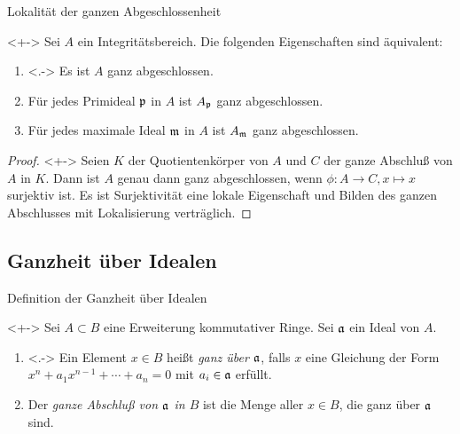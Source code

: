 \begin{frame}{Lokalität der ganzen Abgeschlossenheit}
	\begin{proposition}<+->
		Sei \(A\) ein Integritätsbereich. Die folgenden Eigenschaften sind
		äquivalent:
		\begin{enumerate}[<+->]
		\item<.->
			Es ist \(A\) ganz abgeschlossen.
		\item
			Für jedes Primideal \(\mathfrak{p}\) in \(A\) ist \(A_{\mathfrak{p}}\)
			ganz abgeschlossen.
		\item
			Für jedes maximale Ideal \(\mathfrak{m}\) in \(A\) ist \(A_{\mathfrak{m}}\)
			ganz abgeschlossen.
		\end{enumerate}
	\end{proposition}
	\begin{proof}<+->
		Seien \(K\) der Quotientenkörper von \(A\) und \(C\) der ganze Abschluß
		von \(A\) in \(K\). Dann ist \(A\) genau dann ganz abgeschlossen,
		wenn \(\phi\colon A \to C, x \mapsto x\) surjektiv ist. Es ist
		Surjektivität eine lokale Eigenschaft und Bilden des ganzen Abschlusses
		mit Lokalisierung verträglich.
	\end{proof}
\end{frame}

\subsection{Ganzheit über Idealen}

\begin{frame}{Definition der Ganzheit über Idealen}
	\begin{definition}<+->
		Sei \(A \subset B\) eine Erweiterung kommutativer Ringe. Sei
		\(\mathfrak{a}\) ein Ideal von \(A\).
		\begin{enumerate}[<+->]
		\item<.->
			Ein Element \(x \in B\) heißt
			\emph{ganz über \(\mathfrak{a}\)}, falls \(x\) eine Gleichung der
			Form \(x^n + a_1 x^{n - 1} + \dotsb + a_n = 0\) mit \(a_i \in \mathfrak{a}\)
			erfüllt.
		\item
			Der \emph{ganze Abschluß von \(\mathfrak{a}\) in \(B\)} ist die Menge
			aller \(x \in B\), die ganz über \(\mathfrak{a}\) sind.
		\end{enumerate}
	\end{definition}
\end{frame}

